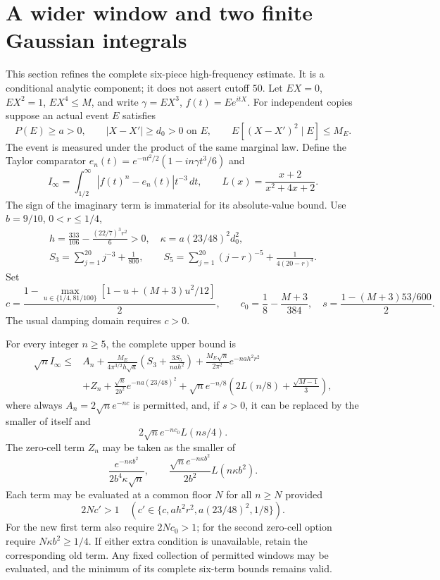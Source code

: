 \section{A wider window and two finite Gaussian integrals}
\label{high50:window}
This section refines the complete six-piece high-frequency estimate.
It is a conditional analytic component; it does not assert cutoff $50$.
Let $EX=0$, $EX^2=1$, $EX^4\le M$, and write
$\gamma=EX^3$, $f(t)=Ee^{itX}$. For independent copies suppose an
actual event $E$ satisfies
\[
 P(E)\ge a>0,\qquad |X-X'|\ge d_0>0\text{ on }E,\qquad
 E[(X-X')^2\mid E]\le M_E.
\]
The event is measured under the product of the same marginal law.
Define the Taylor comparator
$e_n(t)=e^{-nt^2/2}(1-in\gamma t^3/6)$ and
\[
 I_\infty=\int_{1/2}^{\infty}|f(t)^n-e_n(t)|t^{-3}\,dt,
 \qquad L(x)=\frac{x+2}{x^2+4x+2}.
\]
The sign of the imaginary term is immaterial for its absolute-value bound.
Use $b=9/10$, $0<r\le1/4$,
\begin{gather*}
 h=\frac{333}{106}-\frac{(22/7)^3r^2}{6}>0,\quad
 \kappa=a(23/48)^2d_0^2,\\
 S_3=\sum_{j=1}^{20}j^{-3}+\frac1{800},\qquad
 S_5=\sum_{j=1}^{20}(j-r)^{-5}+\frac1{4(20-r)^4}.
\end{gather*}
Set
\[
 c=\frac{1-\max_{u\in\{1/4,81/100\}}
              [1-u+(M+3)u^2/12]}2,\qquad
 c_0=\frac18-\frac{M+3}{384},\quad
 s=\frac{1-(M+3)53/600}{2}.
\]
The usual damping domain requires $c>0$.

\begin{lemma}
For every integer $n\ge5$, the complete upper bound is
\begin{align*}
 \sqrt n I_\infty\le{}& A_n
 +\frac{M_E}{4\pi^{3/2}h\sqrt a}
       \left(S_3+\frac{3S_5}{nah^2}\right)
 +\frac{M_E\sqrt n}{2\pi^2}e^{-nah^2r^2}\\
 &+Z_n+\frac{\sqrt n}{2b^2}e^{-na(23/48)^2}
 +\sqrt n e^{-n/8}\left(2L(n/8)+\frac{\sqrt{M-1}}3\right),
\end{align*}
where always $A_n=2\sqrt n e^{-nc}$ is permitted, and, if $s>0$,
it can be replaced by the smaller of itself and
\[
 2\sqrt n e^{-nc_0}L(ns/4).
\]
The zero-cell term $Z_n$ may be taken as the smaller of
\[
 \frac{e^{-n\kappa b^2}}{2b^4\kappa\sqrt n},\qquad
 \frac{\sqrt n e^{-n\kappa b^2}}{2b^2}L(n\kappa b^2).
\]
Each term may be evaluated at a common floor $N$ for all $n\ge N$
provided
\[
 2Nc'>1\quad(c'\in\{c,ah^2r^2,a(23/48)^2,1/8\}).
\]
For the new first term also require $2Nc_0>1$;
for the second zero-cell option require $N\kappa b^2\ge1/4$.
If either extra condition is unavailable, retain the corresponding old term.
Any fixed collection of permitted windows may be evaluated, and the minimum
of its complete six-term bounds remains valid.
\end{lemma}

